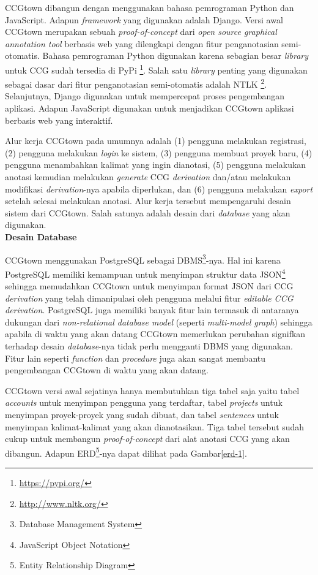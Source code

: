CCGtown dibangun dengan menggunakan bahasa pemrograman Python dan JavaScript.
Adapun \textit{framework} yang digunakan adalah Django.
Versi awal CCGtown merupakan sebuah \textit{proof-of-concept} dari
\textit{open source graphical annotation tool} berbasis web yang dilengkapi dengan fitur
penganotasian semi-otomatis.
Bahasa pemrograman Python digunakan karena sebagian besar \textit{library} untuk CCG
sudah tersedia di PyPi \footnote{\url{https://pypi.org/}}.
Salah satu \textit{library} penting yang digunakan sebagai dasar dari fitur penganotasian
semi-otomatis adalah NTLK \footnote{\url{http://www.nltk.org/}}.
Selanjutnya, Django digunakan untuk mempercepat proses pengembangan aplikasi.
Adapun JavaScript digunakan untuk menjadikan CCGtown aplikasi berbasis web yang interaktif.

Alur kerja CCGtown pada umumnya adalah (1) pengguna melakukan registrasi, (2) pengguna
melakukan \textit{login} ke sistem, (3) pengguna membuat proyek baru, (4) pengguna
menambahkan kalimat yang ingin dianotasi, (5) pengguna melakukan anotasi kemudian melakukan
\textit{generate} CCG \textit{derivation} dan/atau melakukan modifikasi
\textit{derivation}-nya apabila diperlukan, dan (6) pengguna melakukan \textit{export}
setelah selesai melakukan anotasi. Alur kerja tersebut mempengaruhi desain sistem dari
CCGtown. Salah satunya adalah desain dari \textit{database} yang akan digunakan.
\\


\noindent\textbf{Desain Database}

CCGtown menggunakan PostgreSQL sebagai
DBMS\footnote{Database Management System}-nya.
Hal ini karena PostgreSQL memiliki kemampuan untuk menyimpan struktur data
JSON\footnote{JavaScript Object Notation} sehingga memudahkan CCGtown untuk menyimpan
format JSON dari CCG \textit{derivation} yang telah dimanipulasi oleh pengguna melalui
fitur \textit{editable CCG derivation}.
PostgreSQL juga memiliki banyak fitur lain termasuk di antaranya dukungan
dari \textit{non-relational database model} (seperti \textit{multi-model graph})
sehingga apabila di waktu yang akan datang CCGtown memerlukan perubahan signifkan
terhadap desain \textit{database}-nya tidak perlu mengganti DBMS yang digunakan.
Fitur lain seperti \textit{function} dan \textit{procedure} juga akan sangat membantu
pengembangan CCGtown di waktu yang akan datang.

CCGtown versi awal sejatinya hanya membutuhkan tiga tabel saja yaitu tabel
\textit{accounts} untuk menyimpan pengguna yang terdaftar, tabel
\textit{projects} untuk menyimpan proyek-proyek yang sudah dibuat, dan tabel
\textit{sentences} untuk menyimpan kalimat-kalimat yang akan dianotasikan.
Tiga tabel tersebut sudah cukup untuk membangun \textit{proof-of-concept} dari
alat anotasi CCG yang akan dibangun. Adapun
ERD\footnote{Entity Relationship Diagram}-nya dapat dilihat pada Gambar\ref{erd-1}.


